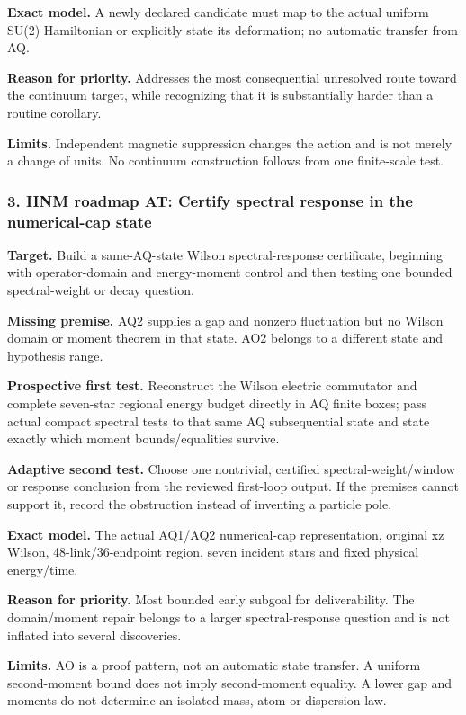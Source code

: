 \textbf{Exact model.} A newly declared candidate must map to the actual uniform SU(2) Hamiltonian or explicitly state its deformation; no automatic transfer from AQ.

\textbf{Reason for priority.} Addresses the most consequential unresolved route toward the continuum target, while recognizing that it is substantially harder than a routine corollary.

\textbf{Limits.} Independent magnetic suppression changes the action and is not merely a change of units. No continuum construction follows from one finite-scale test.

\subsubsection{3. HNM roadmap AT: Certify spectral response in the numerical-cap state}
\textbf{Target.} Build a same-AQ-state Wilson spectral-response certificate, beginning with operator-domain and energy-moment control and then testing one bounded spectral-weight or decay question.

\textbf{Missing premise.} AQ2 supplies a gap and nonzero fluctuation but no Wilson domain or moment theorem in that state. AO2 belongs to a different state and hypothesis range.

\textbf{Prospective first test.} Reconstruct the Wilson electric commutator and complete seven-star regional energy budget directly in AQ finite boxes; pass actual compact spectral tests to that same AQ subsequential state and state exactly which moment bounds/equalities survive.

\textbf{Adaptive second test.} Choose one nontrivial, certified spectral-weight/window or response conclusion from the reviewed first-loop output. If the premises cannot support it, record the obstruction instead of inventing a particle pole.

\textbf{Exact model.} The actual AQ1/AQ2 numerical-cap representation, original xz Wilson, 48-link/36-endpoint region, seven incident stars and fixed physical energy/time.

\textbf{Reason for priority.} Most bounded early subgoal for deliverability. The domain/moment repair belongs to a larger spectral-response question and is not inflated into several discoveries.

\textbf{Limits.} AO is a proof pattern, not an automatic state transfer. A uniform second-moment bound does not imply second-moment equality. A lower gap and moments do not determine an isolated mass, atom or dispersion law.

